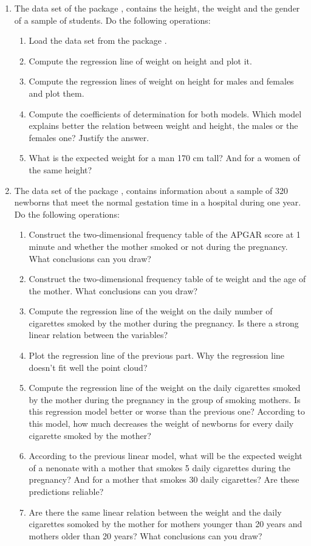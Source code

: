 \begin{enumerate}[leftmargin=*]
\item The data set  of the package , contains the height, the
weight and the gender of a sample of students.
Do the following operations:
\begin{enumerate}
\item Load the data set  from the package .
\item Compute the regression line of weight on height and plot it.
\item Compute the regression lines of weight on height for males and females and plot them.
\item Compute the coefficients of determination for both models. 
Which model explains better the relation between weight and height, the males or the females one?
Justify the answer.
\item What is the expected weight for a man 170 cm tall? And for a women of the same height?
\end{enumerate}

\item The data set  of the package , contains information about a
sample of 320 newborns that meet the normal gestation time in a hospital during one year.
Do the following operations:
\begin{enumerate}
\item Construct the two-dimensional frequency table of the APGAR score at 1 minute and whether the mother smoked or not
during the pregnancy.
What conclusions can you draw?
\item Construct the two-dimensional frequency table of te weight and the age of the mother.
What conclusions can you draw?
\item Compute the regression line of the weight on the daily number of cigarettes smoked by the mother during the
pregnancy.
Is there a strong linear relation between the variables?
\item Plot the regression line of the previous part. 
Why the regression line doesn't fit well the point cloud?
\item Compute the regression line of the weight on the daily cigarettes smoked by the mother during the
pregnancy in the group of smoking mothers.
Is this regression model better or worse than the previous one?
According to this model, how much decreases the weight of newborns for every daily cigarette smoked by the mother?
\item According to the previous linear model, what will be the expected weight of a nenonate with a mother that
smokes 5 daily cigarettes during the pregnancy?
And for a mother that smokes 30 daily cigarettes?
Are these predictions reliable?
\item Are there the same linear relation between the weight and the daily cigarettes somoked by the mother for mothers
younger than 20 years and mothers older than 20 years?
What conclusions can you draw?
\end{enumerate}
\end{enumerate}